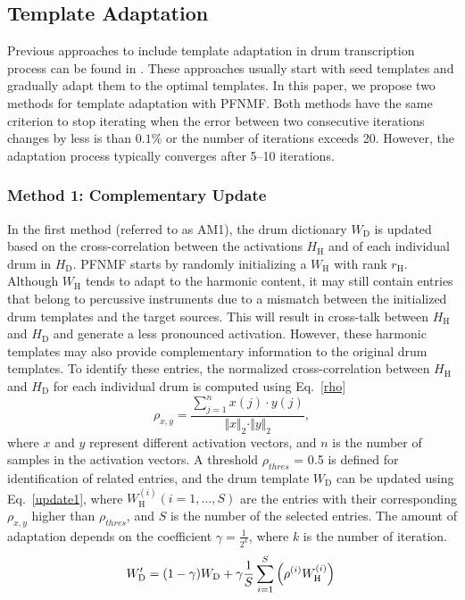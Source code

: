 \documentclass{article}
\begin{document}
\subsection{Template Adaptation}\label{subsec:templateAdapt}
Previous approaches to include template adaptation in drum transcription process can be found in \cite{yoshii_drum_2007,Dittmar2014}. These approaches usually start with seed templates and gradually adapt them to the optimal templates. In this paper, we propose two methods for template adaptation with PFNMF. 
Both methods have the same criterion to stop iterating when the error between two consecutive iterations changes by less is than $0.1\%$ or the number of iterations exceeds 20. However, the adaptation process typically converges after 5--10 iterations. 

\subsubsection{Method 1: Complementary Update}\label{subsubsec:method1}
In the first method (referred to as AM1), the drum dictionary $W_\mathrm{D}$ is updated based on the cross-correlation between the activations $H_\mathrm{H}$ and of each individual drum in $H_\mathrm{D}$. PFNMF starts by randomly initializing a $W_\mathrm{H}$ with rank $r_\mathrm{H}$. Although $W_\mathrm{H}$ tends to adapt to the harmonic content, it may still contain entries that belong to percussive instruments due to a mismatch between the initialized drum templates and the target sources. This will result in cross-talk between $H_\mathrm{H}$ and $H_\mathrm{D}$ and generate a less pronounced activation. However, these harmonic templates may also provide complementary information to the original drum templates. To identify these entries, the normalized cross-correlation between $H_\mathrm{H}$ and $H_\mathrm{D}$ for each individual drum is computed using Eq.~\eqref{rho}
\begin{equation}\label{rho}
\rho_{x, y} = \frac{\sum_{j=1}^n x(j)\cdot y(j)}{\Vert x \Vert_2 \cdot \Vert y \Vert_2},
\end{equation}    
where $x$ and $y$ represent different activation vectors, and $n$ is the number of samples in the activation vectors. A threshold $\rho_{thres}$ = 0.5 is defined for identification of related entries, and the drum template $W_\mathrm{D}$ can be updated using Eq.~\eqref{update1}, where $W_\mathrm{H}^{(i)} (i = 1, ..., S)$ are the entries with their corresponding $\rho_{x, y}$ higher than $\rho_{thres}$, and $S$ is the number of the selected entries. The amount of adaptation depends on the coefficient $\gamma = \frac{1}{2^{k}}$, where $k$ is the number of iteration. 
%
\begin{equation}
\label{update1}
W_\mathrm{D}^{\prime} = (1 - \gamma) W_\mathrm{D} + \gamma \frac{1}{S} \sum_{i=1}^S\left(\rho^{(i)} W_\mathrm{H}^{(i)}\right)\\
\end{equation}
\end{document}
